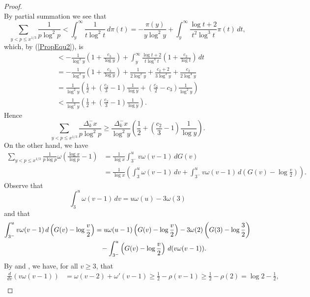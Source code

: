 \documentclass[12pt,reqno]{amsart}
\begin{document}
\begin{proof}
\begin{equation}
\end{equation}
By partial summation we see that
\begin{equation*}
\sum_{y<p\le x^{1/3}}\frac{1}{p\log^2 p}<\int_{y}^{\infty}\frac{1}{t\log^2t}\,d\pi(t)=-\frac{\pi(y)}{y\log^2y}+\int_{y}^{\infty}\frac{\log t+2}{t^2\log^3t}\pi(t)\,dt,
\end{equation*}
which, by (\ref{PropEqu2}), is
\begin{align*}
&<-\frac{1}{\log^3y}\left(1+\frac{c_3}{\log y}\right)+\int_{y}^{\infty}\frac{\log t+2}{t\log^4t}\left(1+\frac{c_2}{\log t}\right)\,dt \\
&=-\frac{1}{\log^3y}\left(1+\frac{c_3}{\log y}\right)+\frac{1}{2\log^2y}+\frac{c_2+2}{3\log^3y}+\frac{c_2}{2\log^4y}\\
&=\frac{1}{\log^2y}\left(\frac{1}{2}+\left(\frac{c_2}{3}-1\right)\frac{1}{\log y}+\left(\frac{c_2}{2}-c_3\right)\frac{1}{\log^2y}\right)\\
&<\frac{1}{\log^2y}\left(\frac{1}{2}+\left(\frac{c_2}{3}-1\right)\frac{1}{\log y}\right).
\end{align*}
Hence
\begin{equation}\label{PropEqu9}
\sum_{y<p\le x^{1/3}}\frac{\Delta_k^-x}{p\log^2 p}\ge\frac{\Delta_k^-x}{\log^2y}\left(\frac{1}{2}+\left(\frac{c_2}{3}-1\right)\frac{1}{\log y}\right).
\end{equation}
On the other hand, we have
\begin{align*}
\sum_{y<p\le x^{1/3}}\frac{1}{p\log p}\omega\left(\frac{\log x}{\log p}-1\right)&=\frac{1}{\log x}\int_{3^-}^{u}v\omega(v-1)\,dG(v)\\
&=\frac{1}{\log x}\left(\int_{3}^{u}\omega(v-1)\,dv+\int_{3^-}^{u}v\omega(v-1)\,d\left(G(v)-\log\frac{v}{2}\right)\right).
\end{align*}
Observe that 
\[\int_{3}^{u}\omega(v-1)\,dv=u\omega(u)-3\omega(3)\]
and that
\begin{align*}
\int_{3^-}^{u}v\omega(v-1)\,d\left(G(v)-\log\frac{v}{2}\right)&=u\omega(u-1)\left(G(v)-\log\frac{v}{2}\right)-3\omega(2)\left(G(3)-\log\frac{3}{2}\right)\\
	&\hspace*{3mm}-\int_{3^-}^{u}\left(G(v)-\log\frac{v}{2}\right)\,d(v\omega(v-1)).
\end{align*}
By \cite[(6.23), p. 562]{T} and \cite[Theorems III.5.7 \& III.6.6]{T}, we have, for all $v\ge3$, that
\begin{align*}
	\frac{d}{dv}(v\omega(v-1))&=\omega(v-2)+\omega'(v-1)\ge\frac{1}{2}-\rho(v-1)\ge\frac{1}{2}-\rho(2)=\log2-\frac{1}{2},\\

\end{align*}
\end{proof}
\end{document}
